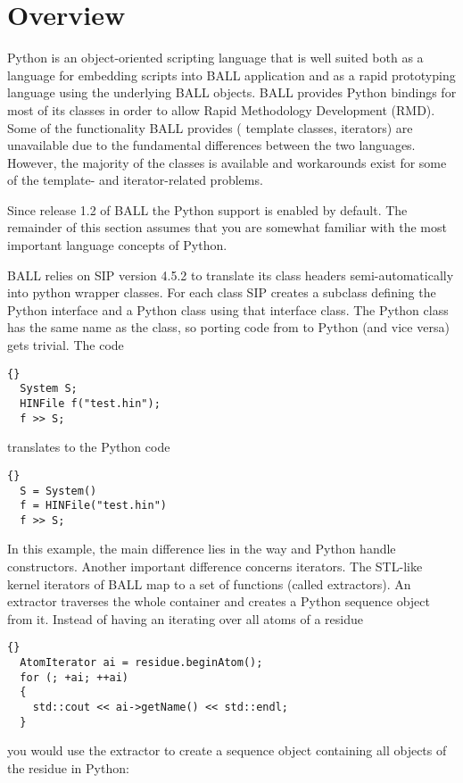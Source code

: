 \section{Overview}
Python is an object-oriented scripting language\cite{Python} that is well
suited both as a language for embedding scripts into BALL application and as a
rapid prototyping language using the underlying BALL objects.
BALL provides Python bindings for most of its classes in order to allow Rapid
Methodology Development (RMD). Some of the functionality BALL provides (\eg
template classes, iterators) are unavailable due to the fundamental differences 
between the two languages. However, the majority of the classes is available and
workarounds exist for some of the template- and iterator-related problems.

Since release 1.2 of BALL the Python support is enabled by default. The 
remainder of this section assumes that you are somewhat familiar with the most
important language concepts of Python.

BALL relies on SIP \cite{SIP} version 4.5.2 to translate its class
headers semi-automatically into python wrapper classes. For each \CPP class
SIP creates a subclass defining the Python interface and a Python class
using that \CPP interface class. The Python class has the same name as the
\CPP class, so porting code from \CPP to Python (and vice versa) gets trivial.
The \CPP code 

\begin{lstlisting}{}
  System S;
  HINFile f("test.hin");
  f >> S;
\end{lstlisting}

\noindent
translates to the Python code

\begin{lstlisting}{}
  S = System()
  f = HINFile("test.hin")
  f >> S;
\end{lstlisting}

\noindent
In this example, the main difference lies in the way \CPP and Python handle
constructors. Another important difference concerns iterators. The STL-like
kernel iterators of BALL map to a set of functions (called extractors). An
extractor traverses the whole container and creates a Python sequence object
from it. Instead of having an  iterating over all atoms of
a residue

\begin{lstlisting}{}
  AtomIterator ai = residue.beginAtom();
  for (; +ai; ++ai)
  {
    std::cout << ai->getName() << std::endl;
  }
\end{lstlisting}
\noindent
you would use the  extractor to create a sequence
object containing all objects of the residue in Python:

